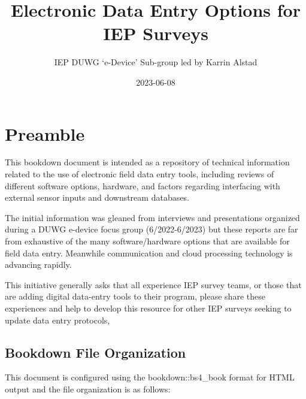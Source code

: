 \documentclass[
]{book}
\title{Electronic Data Entry Options for IEP Surveys}
\author{IEP DUWG `e-Device' Sub-group led by Karrin Alstad}
\date{2023-06-08}
\begin{document}
\maketitle

{
\setcounter{tocdepth}{1}
\tableofcontents
}
\hypertarget{preamble}{%
\chapter*{Preamble}\label{preamble}}

This bookdown document is intended as a repository of technical information related to the use of electronic field data entry tools, including reviews of different software options, hardware, and factors regarding interfacing with external sensor inputs and downstream databases.

The initial information was gleaned from interviews and presentations organized during a DUWG e-device focus group (6/2022-6/2023) but these reports are far from exhaustive of the many software/hardware options that are available for field data entry. Meanwhile communication and cloud processing technology is advancing rapidly.

This initiative generally asks that all experience IEP survey teams, or those that are adding digital data-entry tools to their program, please share these experiences and help to develop this resource for other IEP surveys seeking to update data entry protocols,

\hypertarget{bookdown-file-organization}{%
\section{Bookdown File Organization}\label{bookdown-file-organization}}

This document is configured using the bookdown::bs4\_book format for HTML output and the file organization is as follows:
\end{document}
